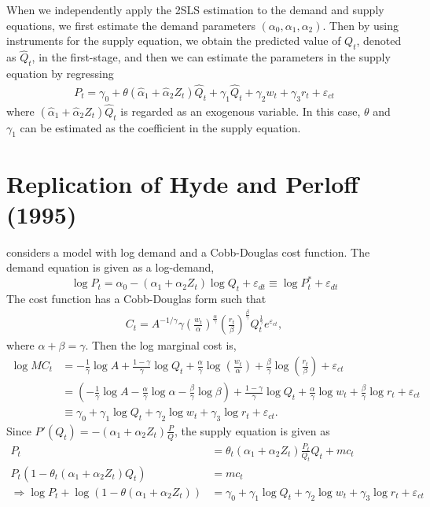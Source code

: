 \documentclass[11pt, a4paper]{article}
\numberwithin{figure}{section}
\theoremstyle{definition}
\newcommand{\0}{\mathbf{0}}
\begin{document}
When we independently apply the 2SLS estimation to the demand and supply equations, we first estimate the demand parameters $(\alpha_0, \alpha_1, \alpha_2)$. Then by using instruments for the supply equation, we obtain the predicted value of $Q_t$, denoted as $\hat{Q}_t$, in the first-stage, and then we can estimate the parameters in the supply equation by regressing
\begin{align*}
     P_t = \gamma_0 + \theta(\hat{\alpha}_1 + \hat{\alpha}_2Z_t)\hat{Q}_t+ \gamma_1\hat{Q}_t  + \gamma_2 w_t + \gamma_3 r_t + \varepsilon_{ct}
\end{align*}
where $(\hat{\alpha}_1 + \hat{\alpha}_2Z_t)\hat{Q}_t$ is regarded as an exogenous variable. In this case, $\theta$ and $\gamma_1$ can be estimated as the coefficient in the supply equation.




\section{Replication of Hyde and Perloff (1995)}
\citet{hyde1995can} considers a model with log demand and a Cobb-Douglas cost function. 
The demand equation is given as a log-demand, 
\[\log P_{t} = \alpha_0 - (\alpha_1 + \alpha_2 Z_t) \log Q_t + \varepsilon_{dt} \equiv \log P_t^* + \varepsilon_{dt}\]
The cost function has a Cobb-Douglas form such that 
\begin{align*}
    C_t = A^{-1/\gamma} \gamma \left(\frac{w_t}{\alpha}\right)^{\frac{\alpha}{\gamma}} \left(\frac{r_t}{\beta}\right)^{\frac{\beta}{\gamma}} Q_t^{\frac{1}{\gamma}}e^{\varepsilon_{ct}},
\end{align*}
where $\alpha + \beta = \gamma$.
Then the log marginal cost is,
\begin{align*}
    \log MC_t &= -\frac{1}{\gamma}\log A + \frac{1-\gamma}{\gamma}\log Q_t + \frac{\alpha}{\gamma} \log \left(\frac{w_t}{\alpha}\right) + \frac{\beta}{\gamma} \log \left(\frac{r_t}{\beta}\right) + \varepsilon_{ct}\\
        & = \left( -\frac{1}{\gamma}\log A - \frac{\alpha}{\gamma}\log \alpha -  \frac{\beta}{\gamma}\log\beta    \right) + \frac{1-\gamma}{\gamma}\log Q_t + \frac{\alpha}{\gamma} \log w_t + \frac{\beta}{\gamma} \log r_t + \varepsilon_{ct} \\
        &\equiv \gamma_0 + \gamma_1 \log Q_t +  \gamma_2 \log w_t + \gamma_3 \log r_t + \varepsilon_{ct}.
\end{align*}
Since $P'(Q_t) = - (\alpha_1 + \alpha_2 Z_t) \frac{P}{Q} $,  the supply equation is given as
\begin{align*}
    P_t &= \theta_t (\alpha_1 + \alpha_2 Z_t) \frac{P_t}{Q_t} Q_t + mc_t\\
    P_t  \left(1 -  \theta_t (\alpha_1 + \alpha_2 Z_t)Q_t\right) & = mc_t\\
    \Longrightarrow \log P_t + \log(1 - \theta(\alpha_1 + \alpha_2 Z_t)) & =  \gamma_0 + \gamma_1 \log Q_t +  \gamma_2 \log w_t + \gamma_3 \log r_t + \varepsilon_{ct}
\end{align*}
\end{document}
